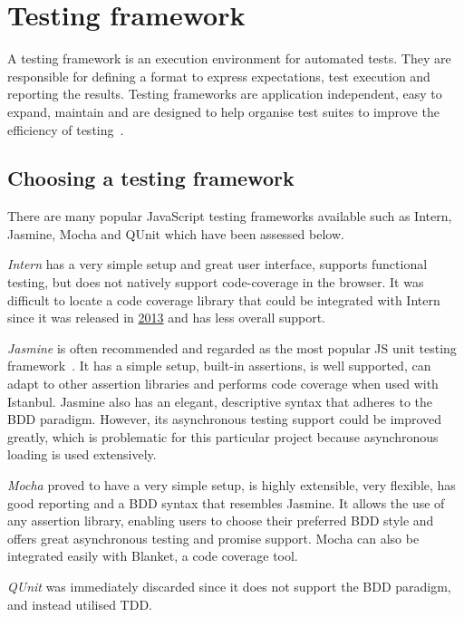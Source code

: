 \section{Testing framework} {
\label{sec:testing_framework}

	A testing framework is an execution environment for automated tests. They are responsible for defining a format to express expectations, test execution and reporting the results. Testing frameworks are application independent, easy to expand, maintain and are designed to help organise test suites to improve the efficiency of testing~\parencite{ghanakota2012testing}.

	\subsection{Choosing a testing framework} {
	\label{sec:choosing_a_testing_framework}

		There are many popular JavaScript testing frameworks available such as Intern, Jasmine, Mocha and QUnit which have been assessed below.

		\emph{Intern} has a very simple setup and great user interface, supports functional testing, but does not natively support code-coverage in the browser. It was difficult to locate a code coverage library that could be integrated with Intern since it was released in \href{https://github.com/theintern}{2013} and has less overall support.

		\emph{Jasmine} is often recommended and regarded as the most popular JS unit testing framework~\parencite{feldman2014testing}. It has a simple setup, built-in assertions, is well supported, can adapt to other assertion libraries and performs code coverage when used with Istanbul. Jasmine also has an elegant, descriptive syntax that adheres to the BDD paradigm. However, its asynchronous testing support could be improved greatly, which is problematic for this particular project because asynchronous loading is used extensively.

		\emph{Mocha} proved to have a very simple setup, is highly extensible, very flexible, has good reporting and a BDD syntax that resembles Jasmine. It allows the use of any assertion library, enabling users to choose their preferred BDD style and offers great asynchronous testing and promise support. Mocha can also be integrated easily with Blanket, a code coverage tool.

		\emph{QUnit} was immediately discarded since it does not support the BDD paradigm, and instead utilised TDD.

}}
